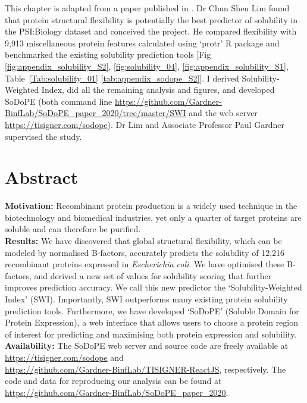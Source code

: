 This chapter is adapted from a paper published in  \cite{Bhandari2020-pz}. Dr Chun Shen Lim found that protein structural flexibility is potentially the best predictor of solubility in the PSI:Biology dataset and conceived the project. He compared flexibility with 9,913 miscellaneous protein features calculated using ‘protr’ R package and benchmarked the existing solubility prediction tools [Fig \ref{fig:appendix_solubility_S2}, \ref{fig:solubility_04},  \ref{fig:appendix_solubility_S1}, Table~\ref{Tab:solubility_01} \ref{tab:appendix_sodope_S2}]. I derived Solubility-Weighted Index,  did all the remaining analysis and figures, and developed SoDoPE (both command line \href{https://github.com/Gardner-BinfLab/SoDoPE\_paper\_2020/tree/master/SWI}{https://github.com/Gardner-BinfLab/SoDoPE\_paper\_2020/tree/master/SWI} and the web server \href{https://tisigner.com/sodope}{https://tisigner.com/sodope}). Dr Lim and Associate Professor Paul Gardner supervised the study.


\section{Abstract}
\textbf{Motivation:} Recombinant protein production is a widely used technique in the biotechnology and biomedical industries, yet only a quarter of target proteins are soluble and can therefore be purified.\\
\textbf{Results:} We have discovered that global structural flexibility, which can be modeled by normalised B-factors, accurately predicts the solubility of 12,216 recombinant proteins expressed in \textit{Escherichia coli}. We have optimised these B-factors, and derived a new set of values for solubility scoring that further improves prediction accuracy. We call this new predictor the ‘Solubility-Weighted Index’ (SWI). Importantly, SWI outperforms many existing protein solubility prediction tools. Furthermore, we have developed ‘SoDoPE’ (Soluble Domain for Protein Expression), a web interface that allows users to choose a protein region of interest for predicting and maximising both protein expression and solubility.\\
\textbf{Availability:} The SoDoPE web server and source code are freely available at\\ \href{https://tisigner.com/sodope}{https://tisigner.com/sodope} and \\ \href{https://github.com/Gardner-BinfLab/TISIGNER-ReactJS}{https://github.com/Gardner-BinfLab/TISIGNER-ReactJS}, respectively.
The code and data for reproducing our analysis can be found at\\ \href{https://github.com/Gardner-BinfLab/SoDoPE\_paper\_2020}{https://github.com/Gardner-BinfLab/SoDoPE\_paper\_2020}.\\



